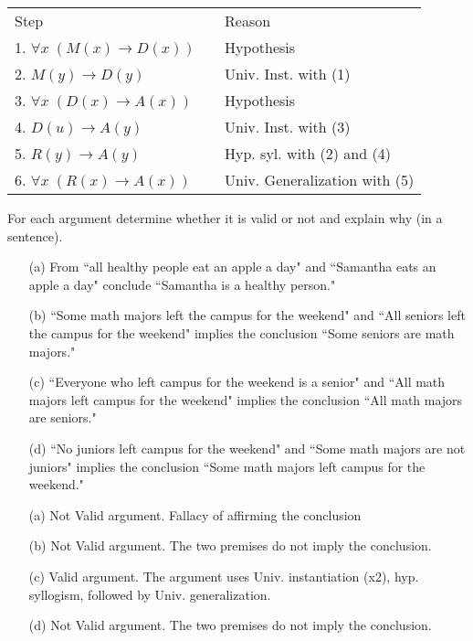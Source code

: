 \begin{questions}
\begin{solution}
\begin{itemize}[itemsep=0pt,parsep=0pt,topsep=0pt,partopsep=0pt]
    \smallskip
    \begin{tabular}{lll}
        Step        & \hspace{0.2in} & Reason \\
        1. $\forall x\;(M(x) \rightarrow D(x))$     &   & Hypothesis \\
        2. $M(y) \rightarrow D(y)$                  & & Univ. Inst. with (1) \\
        3. $\forall x\; (D(x) \rightarrow A(x))$    &   & Hypothesis \\
        4. $D(u) \rightarrow A(y)$                  &   & Univ. Inst. with (3) \\
        5. $R(y) \rightarrow A(y)$                  &   & Hyp. syl. with (2) and (4) \\
        6. $\forall x\;(R(x) \rightarrow A(x))$     &   & Univ. Generalization with (5) \\
    \end{tabular}
    \end{itemize}
  \end{solution}



 For each argument determine whether it is valid or not and explain why (in a sentence).
    \begin{itemize}[itemsep=0pt,parsep=0pt,topsep=0pt,partopsep=0pt]
    \item[(a)] From  ``all healthy people eat an apple a day" and  ``Samantha eats an apple a day" conclude ``Samantha is a healthy person."  
    \item[(b)] ``Some math majors left the campus for the weekend" and ``All seniors left the campus for the weekend" implies the conclusion ``Some seniors are math majors."
    \item[(c)] ``Everyone who left campus for the weekend is a senior" and ``All math majors left campus for the weekend"  implies the conclusion ``All math majors are seniors." 
    \item[(d)] ``No juniors left campus for the weekend" and ``Some math majors are not juniors" implies the conclusion ``Some math majors left campus for the weekend."
    \end{itemize}
   \ifprintanswers
        \vspace{-10pt}
    \fi
\begin{solution}
    \begin{itemize}
        \item[(a)] Not Valid argument.  Fallacy of affirming the conclusion
    \item[(b)] Not Valid argument.  The two premises do not imply the conclusion.
        \item[(c)] Valid argument. The argument uses Univ. instantiation (x2), hyp. syllogism, followed by Univ. generalization.
        \item[(d)] Not Valid argument.  The two premises do not imply the conclusion.
    \end{itemize}
\end{solution}





\end{questions}
